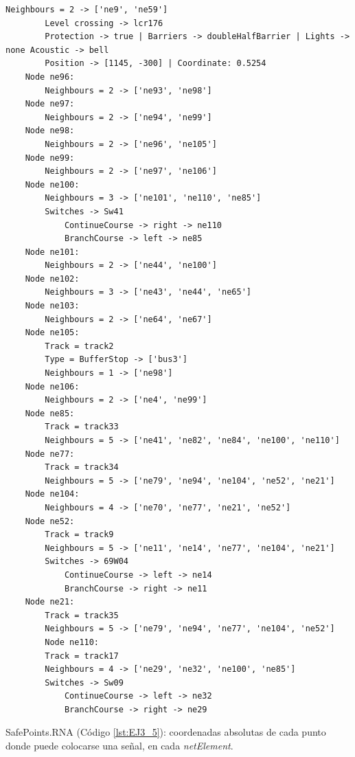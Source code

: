 \begin{lstlisting}[language = {}, tabsize=4, basicstyle=\footnotesize\ttfamily, showspaces=false, showstringspaces=false, caption = Infrastructure.RNA, label = {lst:EJ3_4}]
		Neighbours = 2 -> ['ne9', 'ne59']
		Level crossing -> lcr176
		Protection -> true | Barriers -> doubleHalfBarrier | Lights -> none Acoustic -> bell
		Position -> [1145, -300] | Coordinate: 0.5254
	Node ne96:
		Neighbours = 2 -> ['ne93', 'ne98']
	Node ne97:
		Neighbours = 2 -> ['ne94', 'ne99']
	Node ne98:
		Neighbours = 2 -> ['ne96', 'ne105']
	Node ne99:
		Neighbours = 2 -> ['ne97', 'ne106']
	Node ne100:
		Neighbours = 3 -> ['ne101', 'ne110', 'ne85']
		Switches -> Sw41
			ContinueCourse -> right -> ne110
			BranchCourse -> left -> ne85
	Node ne101:
		Neighbours = 2 -> ['ne44', 'ne100']
	Node ne102:
		Neighbours = 3 -> ['ne43', 'ne44', 'ne65']
	Node ne103:
		Neighbours = 2 -> ['ne64', 'ne67']
	Node ne105:
		Track = track2
		Type = BufferStop -> ['bus3']
		Neighbours = 1 -> ['ne98']
	Node ne106:
		Neighbours = 2 -> ['ne4', 'ne99']
	Node ne85:
		Track = track33
		Neighbours = 5 -> ['ne41', 'ne82', 'ne84', 'ne100', 'ne110']
	Node ne77:
		Track = track34
		Neighbours = 5 -> ['ne79', 'ne94', 'ne104', 'ne52', 'ne21']
	Node ne104:
		Neighbours = 4 -> ['ne70', 'ne77', 'ne21', 'ne52']
	Node ne52:
		Track = track9
		Neighbours = 5 -> ['ne11', 'ne14', 'ne77', 'ne104', 'ne21']
		Switches -> 69W04
			ContinueCourse -> left -> ne14
			BranchCourse -> right -> ne11
	Node ne21:
		Track = track35
		Neighbours = 5 -> ['ne79', 'ne94', 'ne77', 'ne104', 'ne52']
		Node ne110:
		Track = track17
		Neighbours = 4 -> ['ne29', 'ne32', 'ne100', 'ne85']
		Switches -> Sw09
			ContinueCourse -> left -> ne32
			BranchCourse -> right -> ne29
	\end{lstlisting}
	
	SafePoints.RNA (Código \ref{lst:EJ3_5}): coordenadas absolutas de cada punto donde puede colocarse una señal, en cada \textit{netElement}.
	
